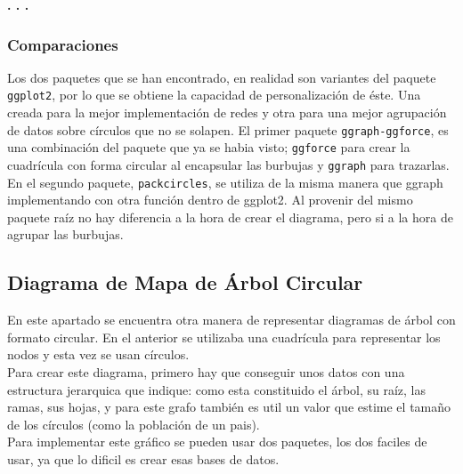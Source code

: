 \documentclass{article}\usepackage[]{graphicx}\usepackage[]{color}
\begin{document}
\begin{center}
\textbf{. . .}
\end{center}
\subsubsection{Comparaciones}
Los dos paquetes que se han encontrado, en realidad son variantes del paquete \texttt{ggplot2}, por lo que se obtiene la capacidad de personalizaci\'on de \'este. Una creada para la mejor implementaci\'on de redes y otra para una mejor agrupaci\'on de datos sobre c\'irculos que no se solapen. El primer paquete \texttt{ggraph-ggforce}, es una combinaci\'on del paquete que ya se habia visto; \texttt{ggforce} para crear la cuadr\'icula con forma circular al encapsular las burbujas y \texttt{ggraph} para trazarlas.~\\
En el segundo paquete, \texttt{packcircles}, se utiliza de la misma manera que ggraph implementando con otra funci\'on dentro de ggplot2. Al provenir del mismo paquete ra\'iz no hay diferencia a la hora de crear el diagrama, pero si a la hora de agrupar las burbujas.
\clearpage
\subsection{Diagrama de Mapa de \'Arbol Circular}\label{ssec:mapaarbol}
En este apartado se encuentra otra manera de representar diagramas de \'arbol con formato circular. En el anterior 
se utilizaba una cuadr\'icula para representar los nodos y esta vez se usan c\'irculos.~\\
Para crear este diagrama, primero hay que conseguir unos datos con una estructura jerarquica que indique: como esta constituido el \'arbol, su ra\'iz, las ramas, sus hojas, y para este grafo tambi\'en es util un valor que estime el tama\~no de los c\'irculos (como la poblaci\'on de un pais).~\\
Para implementar este gr\'afico se pueden usar dos paquetes, los dos faciles de usar, ya que lo dificil es crear esas bases de datos.
\end{document}
